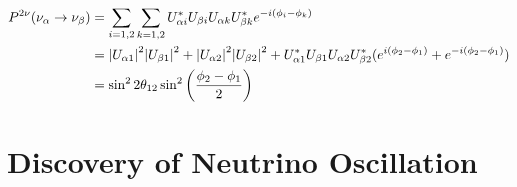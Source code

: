 \begin{equation}
\begin{split}
P^{2\nu}(\nu_\alpha \rightarrow \nu_\beta) 
&= \sum_{i=1,2}\sum_{k=1,2}U^{*}_{\alpha i}U_{\beta i}U_{\alpha k}U^{*}_{\beta k}e^{-i(\phi_{i}-\phi_{k})} \\
&=  \abs{U_{\alpha 1}}^{2}\abs{U_{\beta 1}}^2 + \abs{U_{\alpha 2}}^2\abs{U_{\beta 2}}^2 +
U^{*}_{\alpha 1}U_{\beta 1}U_{\alpha 2}U^{*}_{\beta 2}(e^{i(\phi_2-\phi_1)} + e^{-i(\phi_2 - \phi_1)}) \\ 
&= \sin^22\theta_{12}\sin^2\left(\frac{\phi_2-\phi_1}{2}\right)
\end{split}
\end{equation}





\section{Discovery of Neutrino Oscillation} \label{sec:NeutrinoOsc}


